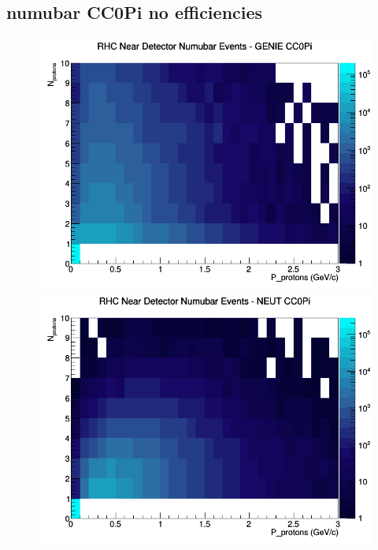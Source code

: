 \documentclass[12pt]{article}
\begin{document}
\subsection{numubar CC0Pi no efficiencies}
\begin{figure}[h]
\includegraphics[width=\linewidth]{N_P/nominal/protons/CC0Pi_RHC_ND_numubar_N_P_GENIE.png}
\endminipage
{}
\includegraphics[width=\linewidth]{N_P/nominal/protons/CC0Pi_RHC_ND_numubar_N_P_NEUT.png}
\endminipage
{}

\end{figure}
\end{document}
